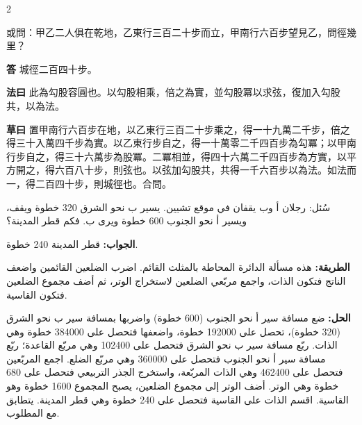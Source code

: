 \documentclass[11pt,a4paper]{article}
\newcommand{\ar}[1]{\arabicfont\beginR #1\endR}
\newcommand{\Answer}[1]{\par\noindent\textbf{\color{problemcolor}答} #1\par}
\newcommand{\Method}[1]{\par\noindent\textbf{\color{problemcolor}法曰} #1\par}
\newcommand{\Workings}[1]{\par\noindent\textbf{\color{problemcolor}草曰} #1\par}
\newcommand{\AnswerAr}{\par\noindent\textbf{\color{problemcolor}\ar{الجواب:}} }
\newcommand{\MethodAr}{\par\noindent\textbf{\color{problemcolor}\ar{الطريقة:}} }
\newcommand{\WorkingsAr}{\par\noindent\textbf{\color{problemcolor}\ar{الحل:}} }
\begin{document}
\begin{paracol}{2}

\noindent 或問：甲乙二人俱在乾地，乙東行三百二十步而立，甲南行六百步望見乙，問徑幾里？

\vspace{0.2cm}

\Answer{城徑二百四十步。}

\vspace{0.2cm}

\Method{此為勾股容圓也。以勾股相乘，倍之為實，並勾股冪以求弦，復加入勾股共，以為法。}

\vspace{0.2cm}

\Workings{置甲南行六百步在地，以乙東行三百二十步乘之，得一十九萬二千步，倍之得三十入萬四千步為實。以乙東行步自之，得一十萬零二千四百步為勾冪；以甲南行步自之，得三十六萬步為股冪。二冪相並，得四十六萬二千四百步為方實，以平方開之，得六百八十步，則弦也。以弦加勾股共，共得一千六百步以為法。如法而一，得二百四十步，則城徑也。合問。}

\switchcolumn

\ar{سُئل: رجلان أ وب يقفان في موقع تشيين. يسير ب نحو الشرق 320 خطوة ويقف، ويسير أ نحو الجنوب 600 خطوة ويرى ب. فكم قطر المدينة؟}

\vspace{0.2cm}

\AnswerAr{قطر المدينة 240 خطوة.}

\vspace{0.2cm}

\MethodAr{هذه مسألة الدائرة المحاطة بالمثلث القائم. اضرب الضلعين القائمين واضعف الناتج فتكون الذات، واجمع مربّعي الضلعين لاستخراج الوتر، ثم أضف مجموع الضلعين فتكون القاسية.}

\vspace{0.2cm}

\WorkingsAr{ضع مسافة سير أ نحو الجنوب (600 خطوة) واضربها بمسافة سير ب نحو الشرق (320 خطوة)، تحصل على 192000 خطوة، واضعفها فتحصل على 384000 خطوة وهي الذات. ربّع مسافة سير ب نحو الشرق فتحصل على 102400 وهي مربّع القاعدة؛ ربّع مسافة سير أ نحو الجنوب فتحصل على 360000 وهي مربّع الضلع. اجمع المربّعين فتحصل على 462400 وهي الذات المربّعة، واستخرج الجذر التربيعي فتحصل على 680 خطوة وهي الوتر. أضف الوتر إلى مجموع الضلعين، يصبح المجموع 1600 خطوة وهو القاسية. اقسم الذات على القاسية فتحصل على 240 خطوة وهي قطر المدينة. يتطابق مع المطلوب.}

\end{paracol}

\vspace{0.5cm}
\end{document}
